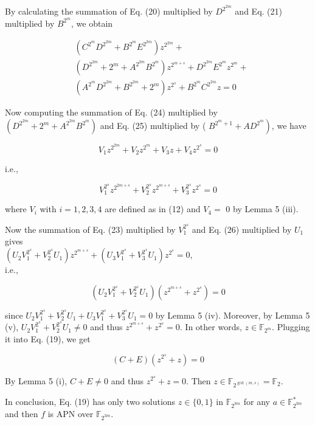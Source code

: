 \documentclass[10pt]{article}
\begin{document}
By calculating the summation of Eq. (20) multiplied by $D^{2^{2 m}}$ and Eq. (21) multiplied by $B^{2^{m}}$, we obtain


\begin{align*}
& \left(C^{2^{m}} D^{2^{2 m}}+B^{2^{m}} E^{2^{2 m}}\right) z^{2^{2 m}}+ \\
& \left(D^{2^{2 m}}+2^{m}+A^{2^{2 m}} B^{2^{m}}\right) z^{2^{m+s}}+D^{2^{2 m}} E^{2^{m}} z^{2^{m}}+ \\
& \left(A^{2^{m}} D^{2^{2 m}}+B^{2^{2 m}}+2^{m}\right) z^{2^{s}}+B^{2^{m}} C^{2^{2 m}} z=0 \tag{25}
\end{align*}


Now computing the summation of Eq. (24) multiplied by $\left(D^{2^{2 m}}+2^{m}+A^{2^{2 m}} B^{2^{m}}\right)$ and Eq. (25) multiplied by ( $B^{2^{m}+1}+ \left.A D^{2^{m}}\right)$, we have

$$
V_{1} z^{2^{2 m}}+V_{2} z^{2^{m}}+V_{3} z+V_{4} z^{2^{s}}=0
$$

i.e.,


\begin{equation*}
V_{1}^{2^{s}} z^{2^{2 m+s}}+V_{2}^{2^{s}} z^{2^{m+s}}+V_{3}^{2^{s}} z^{2^{s}}=0 \tag{26}
\end{equation*}


where $V_{i}$ with $i=1,2,3,4$ are defined as in (12) and $V_{4}=$ 0 by Lemma 5 (iii).

Now the summation of Eq. (23) multiplied by $V_{1}^{2^{s}}$ and Eq. (26) multiplied by $U_{1}$ gives\\
$\left(U_{2} V_{1}^{2^{s}}+V_{2}^{2^{s}} U_{1}\right) z^{2^{m+s}}+\left(U_{3} V_{1}^{2^{s}}+V_{3}^{2^{s}} U_{1}\right) z^{2^{s}}=0$,\\
i.e.,

$$
\left(U_{2} V_{1}^{2^{s}}+V_{2}^{2^{s}} U_{1}\right)\left(z^{2^{m+s}}+z^{2^{s}}\right)=0
$$

since $U_{2} V_{1}^{2^{s}}+V_{2}^{2^{s}} U_{1}+U_{3} V_{1}^{2^{s}}+V_{3}^{2^{s}} U_{1}=0$ by Lemma 5 (iv). Moreover, by Lemma 5 (v), $U_{2} V_{1}^{2^{s}}+V_{2}^{2^{s}} U_{1} \neq 0$ and thus $z^{2^{m+s}}+z^{2^{s}}=0$. In other words, $z \in \mathbb{F}_{2^{m}}$. Plugging it into Eq. (19), we get

$$
(C+E)\left(z^{2^{s}}+z\right)=0
$$

By Lemma 5 (i), $C+E \neq 0$ and thus $z^{2^{s}}+z=0$. Then $z \in \mathbb{F}_{2^{\operatorname{gcd}(m, s)}}=\mathbb{F}_{2}$.

In conclusion, Eq. (19) has only two solutions $z \in\{0,1\}$ in $\mathbb{F}_{2^{3 m}}$ for any $a \in \mathbb{F}_{2^{3 m}}^{*}$ and then $f$ is APN over $\mathbb{F}_{2^{3 m}}$.
\end{document}
